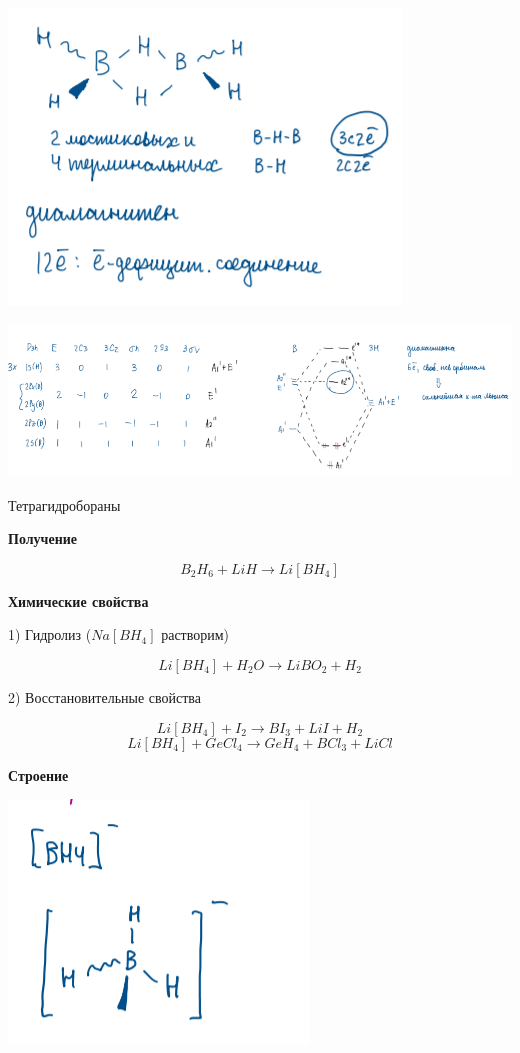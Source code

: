 \includegraphics{images/11v2.png}

\includegraphics{images/11v3.png}


Тетрагидробораны

\textbf{Получение}

$$B_2H_6 + LiH \rightarrow Li[BH_4]$$

\textbf{Химические свойства}

1) Гидролиз ($Na[BH_4]$ растворим)

$$Li[BH_4] + H_2O \rightarrow LiBO_2 + H_2$$

2) Восстановительные свойства

$$Li[BH_4] + I_2 \rightarrow BI_3 + LiI + H_2$$
$$Li[BH_4] + GeCl_4 \rightarrow GeH_4 + BCl_3 + LiCl$$

\textbf{Строение}

\includegraphics{images/11v4.png}

